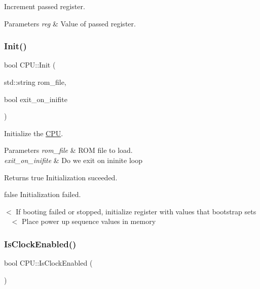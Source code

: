 Increment passed register. 


\begin{DoxyParams}{Parameters}
{\em reg} & Value of passed register. \\
\hline
\end{DoxyParams}
\mbox{\label{classCPU_a72afeb809bf193928349e6f948f60bfc}} 
\subsubsection{\texorpdfstring{Init()}{Init()}}
{\footnotesize\ttfamily bool C\+P\+U\+::\+Init (\begin{DoxyParamCaption}\item[{std\+::string}]{rom\+\_\+file,  }\item[{bool}]{exit\+\_\+on\+\_\+inifite }\end{DoxyParamCaption})}



Initialize the \mbox{\hyperlink{classCPU}{C\+PU}}. 


\begin{DoxyParams}{Parameters}
{\em rom\+\_\+file} & R\+OM file to load. \\
\hline
{\em exit\+\_\+on\+\_\+inifite} & Do we exit on ininite loop \\
\hline
\end{DoxyParams}
\begin{DoxyReturn}{Returns}
true Initialization suceeded. 

false Initialization failed. 
\end{DoxyReturn}
$<$ If booting failed or stopped, initialize register with values that bootstrap sets ~\newline
 $<$ Place power up sequence values in memory \mbox{\label{classCPU_a66108f133258f1d4348e79f19287d4ed}} 
\subsubsection{\texorpdfstring{Is\+Clock\+Enabled()}{IsClockEnabled()}}
{\footnotesize\ttfamily bool C\+P\+U\+::\+Is\+Clock\+Enabled (\begin{DoxyParamCaption}{ }\end{DoxyParamCaption})}



